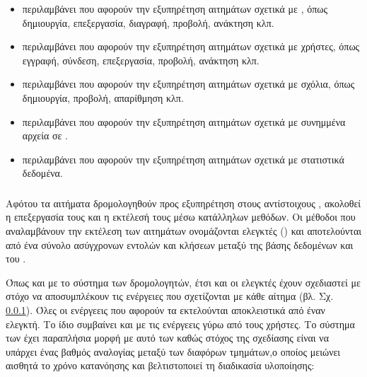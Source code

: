 \begin{itemize}
    \item {} περιλαμβάνει  που αφορούν την εξυπηρέτηση αιτημάτων σχετικά με , όπως δημιουργία, επεξεργασία, διαγραφή, προβολή, ανάκτηση κλπ.
    \item {} περιλαμβάνει  που αφορούν την εξυπηρέτηση αιτημάτων σχετικά με χρήστες, όπως εγγραφή, σύνδεση, επεξεργασία, προβολή, ανάκτηση κλπ.
    \item {} περιλαμβάνει  που αφορούν την εξυπηρέτηση αιτημάτων σχετικά με σχόλια, όπως δημιουργία, προβολή, απαρίθμηση κλπ.
    \item {} περιλαμβάνει  που αφορούν την εξυπηρέτηση αιτημάτων σχετικά με συνημμένα αρχεία σε .
    \item {} περιλαμβάνει  που αφορούν την εξυπηρέτηση αιτημάτων σχετικά με στατιστικά δεδομένα.
\end{itemize}

\subsubsection{}

Αφότου τα αιτήματα δρομολογηθούν προς εξυπηρέτηση στους αντίστοιχους , ακολοθεί η επεξεργασία τους και η εκτέλεσή τους μέσω κατάλληλων μεθόδων. Οι μέθοδοι που αναλαμβάνουν την εκτέλεση των αιτημάτων ονομάζονται ελεγκτές () και αποτελούνται από ένα σύνολο ασύγχρονων εντολών και κλήσεων μεταξύ της βάσης δεδομένων και του .

Όπως και με το σύστημα των δρομολογητών, έτσι και οι ελεγκτές έχουν σχεδιαστεί με στόχο να αποσυμπλέκουν τις ενέργειες που σχετίζονται με κάθε αίτημα (βλ. Σχ. \ref{}). Όλες οι ενέργεεις που αφορούν τα  εκτελούνται αποκλειστικά από έναν ελεγκτή. Το ίδιο συμβαίνει και με τις ενέργεεις γύρω από τους χρήστες. Το σύστημα των  έχει παραπλήσια μορφή με αυτό των  καθώς στόχος της σχεδίασης είναι να υπάρχει ένας βαθμός αναλογίας μεταξύ των διαφόρων τμημάτων,ο οποίος μειώνει αισθητά το χρόνο κατανόησης και βελτιστοποιεί τη διαδικασία υλοποίησης:

